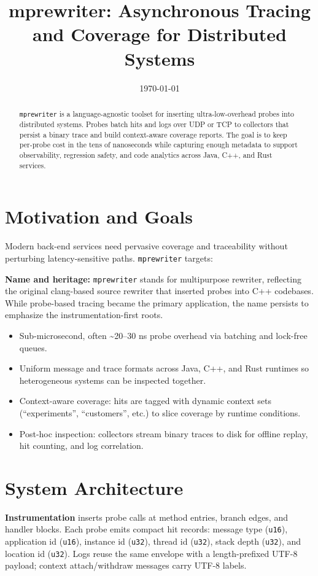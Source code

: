 \documentclass[11pt]{article}
\title{mprewriter: Asynchronous Tracing and Coverage for Distributed Systems}
\author{}
\date{\today}
\begin{document}
\maketitle
\begin{abstract}
\texttt{mprewriter} is a language-agnostic toolset for inserting ultra-low-overhead probes into distributed systems. Probes batch hits and logs over UDP or TCP to collectors that persist a binary trace and build context-aware coverage reports. The goal is to keep per-probe cost in the tens of nanoseconds while capturing enough metadata to support observability, regression safety, and code analytics across Java, C++, and Rust services.
\end{abstract}

\section{Motivation and Goals}
Modern back-end services need pervasive coverage and traceability without perturbing latency-sensitive paths. \texttt{mprewriter} targets:

\textbf{Name and heritage:} \texttt{mprewriter} stands for multipurpose rewriter, reflecting the original clang-based source rewriter that inserted probes into C++ codebases. While probe-based tracing became the primary application, the name persists to emphasize the instrumentation-first roots.
\begin{itemize}[noitemsep]
  \item Sub-microsecond, often \textasciitilde20--30 ns probe overhead via batching and lock-free queues.
  \item Uniform message and trace formats across Java, C++, and Rust runtimes so heterogeneous systems can be inspected together.
  \item Context-aware coverage: hits are tagged with dynamic context sets (``experiments'', ``customers'', etc.) to slice coverage by runtime conditions.
  \item Post-hoc inspection: collectors stream binary traces to disk for offline replay, hit counting, and log correlation.
\end{itemize}

\section{System Architecture}
\textbf{Instrumentation} inserts probe calls at method entries, branch edges, and handler blocks. Each probe emits compact hit records: message type (\texttt{u16}), application id (\texttt{u16}), instance id (\texttt{u32}), thread id (\texttt{u32}), stack depth (\texttt{u32}), and location id (\texttt{u32}). Logs reuse the same envelope with a length-prefixed UTF-8 payload; context attach/withdraw messages carry UTF-8 labels.
\end{document}
